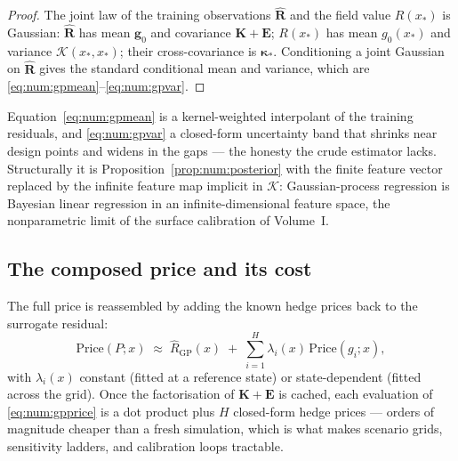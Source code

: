 \begin{proof}
The joint law of the training observations $\hat{\mathbf R}$ and the field value
$R(x_\ast)$ is Gaussian: $\hat{\mathbf R}$ has mean $\mathbf g_0$ and covariance
$\mathbf K + \mathbf E$; $R(x_\ast)$ has mean $g_0(x_\ast)$ and variance
$\mathcal{K}(x_\ast,x_\ast)$; their cross-covariance is $\boldsymbol{\kappa}_\ast$.
Conditioning a joint Gaussian on $\hat{\mathbf R}$ gives the standard conditional
mean and variance, which are \eqref{eq:num:gpmean}--\eqref{eq:num:gpvar}.
\end{proof}

\begin{remark}
Equation~\eqref{eq:num:gpmean} is a kernel-weighted interpolant of the training
residuals, and \eqref{eq:num:gpvar} a closed-form uncertainty band that shrinks
near design points and widens in the gaps --- the honesty the crude estimator
lacks. Structurally it is Proposition~\ref{prop:num:posterior} with the finite
feature vector replaced by the infinite feature map implicit in $\mathcal{K}$:
Gaussian-process regression is Bayesian linear regression in an
infinite-dimensional feature space, the nonparametric limit of the surface
calibration of Volume~I.
\end{remark}

\subsection{The composed price and its cost}

The full price is reassembled by adding the known hedge prices back to the
surrogate residual:
\begin{equation}\label{eq:num:gpprice}
   \mathrm{Price}(P; x) \;\approx\;
   \hat R_{\mathrm{GP}}(x) \;+\; \sum_{i=1}^{H} \lambda_i(x)\,\mathrm{Price}(g_i; x),
\end{equation}
with $\lambda_i(x)$ constant (fitted at a reference state) or state-dependent
(fitted across the grid). Once the factorisation of $\mathbf K + \mathbf E$ is
cached, each evaluation of \eqref{eq:num:gpprice} is a dot product plus $H$
closed-form hedge prices --- orders of magnitude cheaper than a fresh
simulation, which is what makes scenario grids, sensitivity ladders, and
calibration loops tractable.

